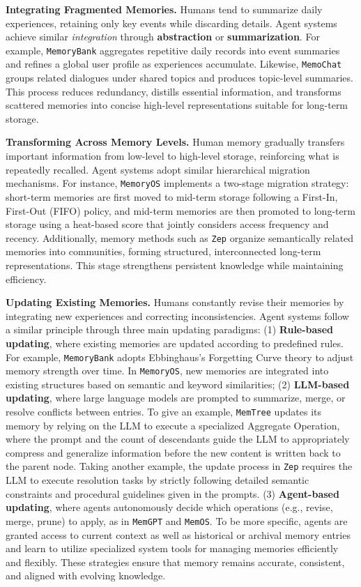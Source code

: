  \textbf{Integrating Fragmented Memories.}  
Humans tend to summarize daily experiences, retaining only key events while discarding details.  
Agent systems achieve similar \textit{integration} through \textbf{abstraction} or \textbf{summarization}. 
For example, {\tt MemoryBank} aggregates repetitive daily records into event summaries and refines a global user profile as experiences accumulate.  
Likewise, {\tt MemoChat} groups related dialogues under shared topics and produces topic-level summaries.  
This process reduces redundancy, distills essential information, and transforms scattered memories into concise high-level representations suitable for long-term storage.

 \textbf{Transforming Across Memory Levels.}  
Human memory gradually transfers important information from low-level to high-level storage, reinforcing what is repeatedly recalled.  
Agent systems adopt similar hierarchical migration mechanisms.  
For instance, {\tt MemoryOS} implements a two-stage migration strategy: short-term memories are first moved to mid-term storage following a First-In, First-Out (FIFO) policy, and mid-term memories are then promoted to long-term storage using a heat-based score that jointly considers access frequency and recency.  
Additionally, memory methods such as {\tt Zep} organize semantically related memories into communities, forming structured, interconnected long-term representations.  
This stage strengthens persistent knowledge while maintaining efficiency.

 \textbf{Updating Existing Memories.}  
Humans constantly revise their memories by integrating new experiences and correcting inconsistencies.  
Agent systems follow a similar principle through three main updating paradigms:
(1) \textbf{Rule-based updating}, where existing memories are updated according to predefined rules. For example, {\tt MemoryBank} adopts Ebbinghaus's Forgetting Curve theory to adjust memory strength over time. In {\tt MemoryOS}, new memories are integrated into existing structures based on semantic and keyword similarities;
(2) \textbf{LLM-based updating}, where large language models are prompted to summarize, merge, or resolve conflicts between entries. To give an example, {\tt MemTree} updates its memory by relying on the LLM to execute a specialized Aggregate Operation, where the prompt and the count of descendants guide the LLM to appropriately compress and generalize information before the new content is written back to the parent node. Taking another example, the update process in {\tt Zep} requires the LLM to execute resolution tasks by strictly following detailed semantic constraints and procedural guidelines given in the prompts.
(3) \textbf{Agent-based updating}, where agents autonomously decide which operations (e.g., revise, merge, prune) to apply, as in {\tt MemGPT} and {\tt MemOS}. To be more specific, agents are granted access to current context as well as historical or archival memory entries and learn to utilize specialized system tools for managing memories efficiently and flexibly.
These strategies ensure that memory remains accurate, consistent, and aligned with evolving knowledge.

